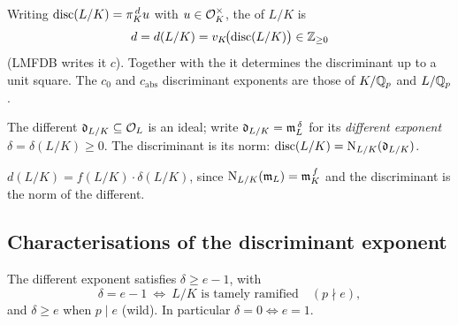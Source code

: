 \begin{definition}
\label{def:disc-exponent}
\notready
Writing $\operatorname{disc}(L/K)=\pi_K^{\,d}u$ with $u\in\mathcal{O}_K^\times$, the
 of $L/K$ is
\[
  d=d(L/K)=v_K\!\bigl(\operatorname{disc}(L/K)\bigr)\in\mathbb{Z}_{\ge 0}
\]
(LMFDB writes it $c$). Together with the
 it determines the
discriminant up to a unit square. The
 $c_0$ and
 $c_{\mathrm{abs}}$
discriminant exponents are those of $K/\mathbb{Q}_p$ and $L/\mathbb{Q}_p$.
\end{definition}

\begin{definition}
\label{def:different-exponent}
\mathlibok
The different $\mathfrak{d}_{L/K}\subseteq\mathcal{O}_L$ is an ideal; write
$\mathfrak{d}_{L/K}=\mathfrak{m}_L^{\,\delta}$ for its \emph{different exponent}
$\delta=\delta(L/K)\ge 0$. The discriminant is its norm:
$\operatorname{disc}(L/K)=\operatorname{N}_{L/K}(\mathfrak{d}_{L/K})$.
\end{definition}

\begin{proposition}
\label{prop:disc-eq-f-delta}
\notready
$d(L/K)=f(L/K)\cdot\delta(L/K)$, since $\operatorname{N}_{L/K}(\mathfrak{m}_L)=\mathfrak{m}_K^{\,f}$ and the
discriminant is the norm of the different.
\end{proposition}

\subsection{Characterisations of the discriminant exponent}
\label{subsec:disc-facts}

\begin{theorem}
\label{thm:dedekind-different}
\notready
The different exponent satisfies $\delta\ge e-1$, with
\[
  \delta=e-1\ \Longleftrightarrow\ L/K\text{ is tamely ramified}\quad(p\nmid e),
\]
and $\delta\ge e$ when $p\mid e$ (wild). In particular $\delta=0\iff e=1$.
\end{theorem}

